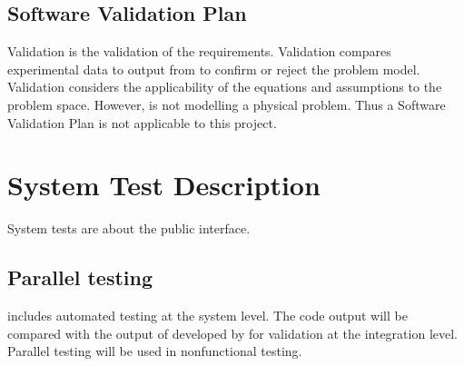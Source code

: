 \documentclass[12pt, titlepage]{article}
\begin{document}
\subsection{Software Validation Plan}

Validation is the validation of the requirements. Validation compares experimental
data to output from  to confirm or reject the problem model. Validation
considers the applicability of the equations and assumptions to the problem space.
However,  is not modelling a physical problem. Thus a
Software Validation Plan is not applicable to this project.

\section{System Test Description}

System tests are about the public interface.

\subsection{Parallel testing}

 includes automated testing at the system level. The code output
will be compared with the output of \rdcon developed by \cite{chang1982} for validation
at the integration level.
Parallel testing will be used in nonfunctional testing.

%  
\end{document}

